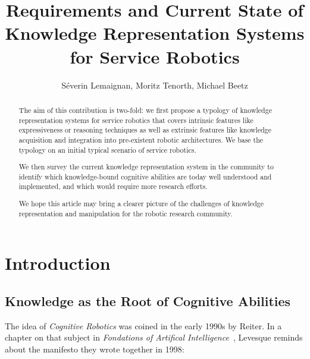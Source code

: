\documentclass[a4paper, twocolumn]{article}
\title{Requirements and Current State of Knowledge Representation Systems for Service Robotics}
\author{Séverin Lemaignan, Moritz Tenorth, Michael Beetz}
\begin{document}
\maketitle
\tableofcontents


\begin{abstract}

The aim of this contribution is two-fold: we first propose a typology of
knowledge representation systems for service robotics that covers intrinsic
features like expressiveness or reasoning techniques as well as extrinsic
features like knowledge acquisition and integration into pre-existent robotic
architectures. We base the typology on an initial typical scenario of service
robotics.

We then survey the current knowledge representation system in the community to
identify which knowledge-bound cognitive abilities are today well understood
and implemented, and which would require more research efforts.

We hope this article may bring a clearer picture of the challenges of knowledge
representation and manipulation for the robotic research community.

\end{abstract}

\section{Introduction}
\label{sect|intro}

\subsection{Knowledge as the Root of Cognitive Abilities}
\label{sect|cognitive-abilities}

The idea of \emph{Cognitive Robotics} was coined in the early 1990s by Reiter.
In a chapter on that subject in \emph{Fondations of Artifical
Intelligence}~\cite{Levesque2008}, Levesque reminds about the manifesto they
wrote together in 1998:
\end{document}

